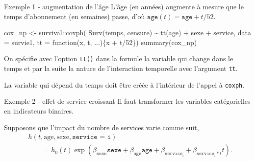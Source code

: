 \documentclass[
  ignorenonframetext,
]{beamer}
\newenvironment{Shaded}{\begin{snugshade}}{\end{snugshade}}
\newcommand{\AttributeTok}[1]{\textcolor[rgb]{0.40,0.45,0.13}{#1}}
\newcommand{\ControlFlowTok}[1]{\textcolor[rgb]{0.00,0.23,0.31}{#1}}
\newcommand{\DecValTok}[1]{\textcolor[rgb]{0.68,0.00,0.00}{#1}}
\newcommand{\FunctionTok}[1]{\textcolor[rgb]{0.28,0.35,0.67}{#1}}
\newcommand{\NormalTok}[1]{\textcolor[rgb]{0.00,0.23,0.31}{#1}}
\newcommand{\OtherTok}[1]{\textcolor[rgb]{0.00,0.23,0.31}{#1}}
\newcommand{\SpecialCharTok}[1]{\textcolor[rgb]{0.37,0.37,0.37}{#1}}
\begin{document}
\begin{frame}[fragile]{Exemple 1 - augmentation de l'âge}
\protect\hypertarget{exemple-1---augmentation-de-luxe2ge}{}
L'âge (en années) augmente à mesure que le temps d'abonnement (en
semaines) passe, d'où \(\texttt{age}(t) = \texttt{age} + t/52\).

\begin{Shaded}
\begin{Highlighting}[numbers=left,,]
\NormalTok{cox\_np }\OtherTok{\textless{}{-}}\NormalTok{ survival}\SpecialCharTok{::}\FunctionTok{coxph}\NormalTok{(}
    \FunctionTok{Surv}\NormalTok{(temps, censure) }\SpecialCharTok{\textasciitilde{}} 
     \FunctionTok{tt}\NormalTok{(age) }\SpecialCharTok{+}\NormalTok{ sexe }\SpecialCharTok{+}\NormalTok{ service, }
     \AttributeTok{data =}\NormalTok{ survie1, }
     \AttributeTok{tt =} \ControlFlowTok{function}\NormalTok{(x, t, ...)\{x }\SpecialCharTok{+}\NormalTok{ t}\SpecialCharTok{/}\DecValTok{52}\NormalTok{\})}
\FunctionTok{summary}\NormalTok{(cox\_np)}
\end{Highlighting}
\end{Shaded}

\footnotesize

On spécifie avec l'option \texttt{tt()} dans la formule la variable qui
change dans le temps et par la suite la nature de l'interaction
temporelle avec l'argument \texttt{tt}.

La variable qui dépend du temps doit être créée à l'intérieur de l'appel
à \texttt{coxph}.
\end{frame}

\begin{frame}{Exemple 2 - effet de service croissant}
\protect\hypertarget{exemple-2---effet-de-service-croissant}{}
Il faut transformer les variables catégorielles en indicateurs binaires.

Supposons que l'impact du nombre de services varie comme suit,
\begin{align*}
&h(t, \text{age}, \text{sexe}, \texttt{service = i}) \\ &\qquad = h_0(t)\exp(\beta_{\texttt{sexe}}\texttt{sexe} + \beta_{\texttt{age}} \texttt{age} + \beta_{\texttt{service}_i} + \beta_{\texttt{service}_i*t}t).
\end{align*}
\end{frame}
\end{document}
